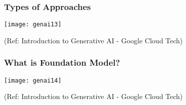 


	






\begin{frame}[fragile]\frametitle{Types of Approaches}

\begin{center}
\texttt{[image: genai13]}
\end{center}


{\tiny (Ref: Introduction to Generative AI - Google Cloud Tech)}

\end{frame}

\begin{frame}[fragile]\frametitle{What is Foundation Model?}

\begin{center}
\texttt{[image: genai14]}
\end{center}


{\tiny (Ref: Introduction to Generative AI - Google Cloud Tech)}

\end{frame}


